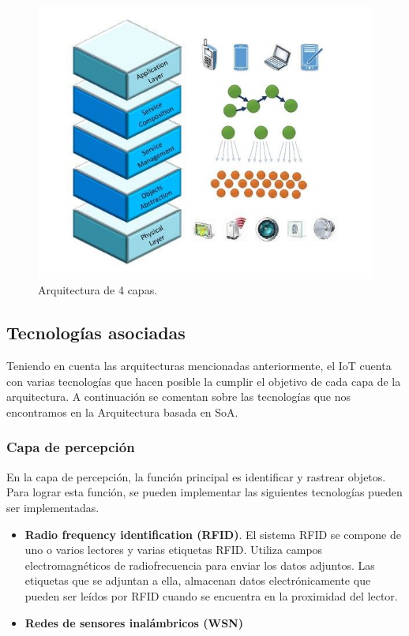 {\begin{figure}[ht!]
    \centering
    \includegraphics[width=\linewidth]{imagenes/SOA-based-architecture-for-IoT-middleware-1.jpg}
    \caption{Arquitectura de 4 capas. \cite{fig-4-layer-arch}}
    \label{fig:figure2}
\end{figure}


\subsection{Tecnologías asociadas}

Teniendo en cuenta las arquitecturas mencionadas anteriormente, el IoT cuenta con varias tecnologías que hacen posible la cumplir el objetivo de cada capa de la arquitectura. A continuación se comentan sobre las tecnologías que nos encontramos en la Arquitectura basada en SoA. \cite{lin2017survey}

\subsubsection{Capa de percepción}

En la capa de percepción, la función principal es identificar y rastrear objetos. Para lograr esta función, se pueden implementar las siguientes tecnologías pueden ser implementadas.

\begin{itemize}
    \item \textbf{Radio frequency identification (RFID)}. El sistema RFID se compone de uno o varios lectores y varias etiquetas RFID. Utiliza campos electromagnéticos de radiofrecuencia para enviar los datos adjuntos. Las etiquetas que se adjuntan a ella, almacenan datos electrónicamente que pueden ser leídos por RFID cuando se encuentra en la proximidad del lector.
    \item \textbf{Redes de sensores inalámbricos (WSN)}
\end{itemize}

}
